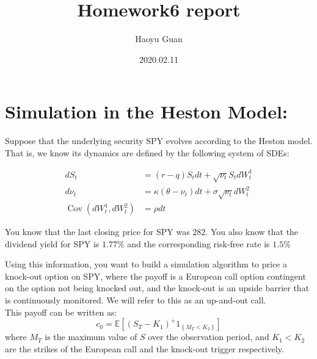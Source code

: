 \documentclass{winnower}
\begin{document}
\title{Homework6 report}

\author{Haoyu Guan}








\date{2020.02.11}

\maketitle




\section{Simulation in the Heston Model:}


\indent Suppose that the underlying security SPY
evolves according to the Heston model. That is, we know its dynamics are defined by the
following system of SDEs:

$$\begin{aligned}
d S_{t} &=(r-q) S_{t} d t+\sqrt{\nu_{t}} S_{t} d W_{t}^{1} \\
d \nu_{t} &=\kappa\left(\theta-\nu_{t}\right) d t+\sigma \sqrt{\nu_{t}} d W_{t}^{2} \\
\operatorname{Cov}\left(d W_{t}^{1}, d W_{t}^{2}\right) &=\rho d t
\end{aligned}$$


You know that the last closing price for SPY was $282 .$ You also know that the dividend yield for SPY is $1.77 \%$ and the corresponding risk-free rate is $1.5 \%$

Using this information, you want to build a simulation algorithm to price a knock-out option on SPY, where the payoff is a European call option contingent on the option not being knocked out, and the knock-out is an upside barrier that is continuously monitored. We will refer to this as an up-and-out call.
\\

This payoff can be written as:
$$
c_{0}=\mathbb{E}\left[\left(S_{T}-K_{1}\right)^{+} 1_{\left\{M_{T}<K_{2}\right\}}\right]
$$
where $M_{T}$ is the maximum value of $S$ over the observation period, and $K_{1}<K_{2}$ are the strikes of the European call and the knock-out trigger respectively.
\\
\end{document}
